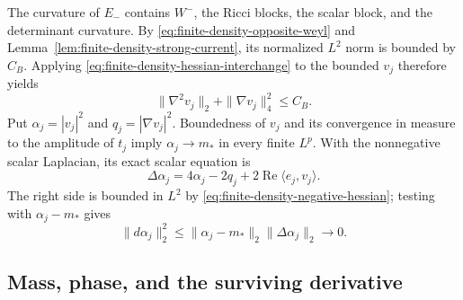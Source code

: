 The curvature of $E_-$ contains $W^-$, the Ricci blocks, the scalar
block, and the determinant curvature.  By
\eqref{eq:finite-density-opposite-weyl} and
Lemma~\ref{lem:finite-density-strong-current}, its normalized $L^2$
norm is bounded by $C_B$.  Applying
\eqref{eq:finite-density-hessian-interchange} to the bounded $v_j$
therefore yields
\begin{equation}
 \|\nabla^2v_j\|_2+\|\nabla v_j\|_4^2\le C_B.
 \label{eq:finite-density-negative-hessian}
\end{equation}
Put $\alpha_j=|v_j|^2$ and $q_j=|\nabla v_j|^2$.  Boundedness of
$v_j$ and its convergence in measure to the amplitude of $t_j$ imply
$\alpha_j\to m_*$ in every finite $L^p$.  With the nonnegative
scalar Laplacian, its exact scalar equation is
\begin{equation}
 \Delta\alpha_j=4\alpha_j-2q_j
       +2\operatorname{Re}\langle e_j,v_j\rangle.
 \label{eq:finite-density-scalar-mass}
\end{equation}
The right side is bounded in $L^2$ by
\eqref{eq:finite-density-negative-hessian}; testing with
$\alpha_j-m_*$ gives
\begin{equation}
 \|d\alpha_j\|_2^2
 \le\|\alpha_j-m_*\|_2\|\Delta\alpha_j\|_2\longrightarrow0.
 \label{eq:finite-density-mass-gradient}
\end{equation}

\subsection{Mass, phase, and the surviving derivative}

